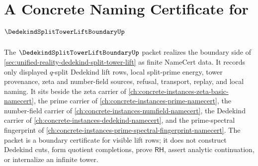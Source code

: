 \chapter{A Concrete Naming Certificate for $\DedekindSplitTowerLiftBoundaryUp$}
\label{ch:concrete-instances-dedekind-split-tower-lift-boundary-namecert}

The $\DedekindSplitTowerLiftBoundaryUp$ packet realizes the boundary side of \autoref{sec:unified-reality-dedekind-split-tower-lift} as finite NameCert data. It records only displayed $q$-split Dedekind lift rows, local split-prime energy, tower provenance, zeta and number-field sources, refusal, transport, replay, and local naming. It sits beside the zeta carrier of \autoref{ch:concrete-instances-zeta-basic-namecert}, the prime carrier of \autoref{ch:concrete-instances-prime-namecert}, the number-field carrier of \autoref{ch:concrete-instances-numfield-namecert}, the Dedekind carrier of \autoref{ch:concrete-instances-dedekind-namecert}, and the prime-spectral fingerprint of \autoref{ch:concrete-instances-prime-spectral-fingerprint-namecert}. The packet is a boundary certificate for visible lift rows; it does not construct Dedekind cuts, form quotient completions, prove $\mathsf{RH}$, assert analytic continuation, or internalize an infinite tower.

